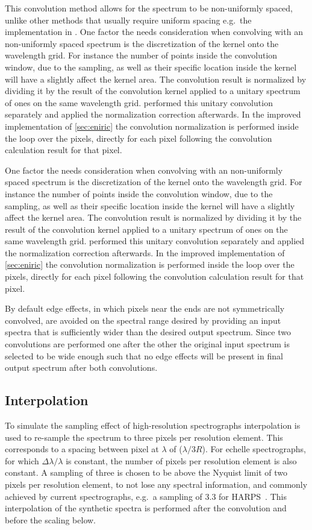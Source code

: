 This convolution method allows for the spectrum to be non-uniformly spaced, unlike other methods that usually require uniform spacing e.g.\ the implementation in \pyastronomy{}.
One factor the needs consideration when convolving with an non-uniformly spaced spectrum is the discretization of the kernel onto the wavelength grid.
For instance the number of points inside the convolution window, due to the sampling, as well as their specific location inside the kernel will have a slightly affect the kernel area.
The convolution result is normalized by dividing it by the result of the convolution kernel applied to a unitary spectrum of ones on the same wavelength grid.
\citet{figueira_radial_2016} performed this unitary convolution separately and applied the normalization correction afterwards.
In the improved implementation of \cref{sec:eniric} the convolution normalization is performed inside the loop over the pixels, directly for each pixel following the convolution calculation result for that pixel.

One factor the needs consideration when convolving with an non-uniformly spaced spectrum is the discretization of the kernel onto the wavelength grid.
For instance the number of points inside the convolution window, due to the sampling, as well as their specific location inside the kernel will have a slightly affect the kernel area.
The convolution result is normalized by dividing it by the result of the convolution kernel applied to a unitary spectrum of ones on the same wavelength grid.
\citet{figueira_radial_2016} performed this unitary convolution separately and applied the normalization correction afterwards.
In the improved implementation of \cref{sec:eniric} the convolution normalization is performed inside the loop over the pixels, directly for each pixel following the convolution calculation result for that pixel.

By default edge effects, in which pixels near the ends are not symmetrically convolved, are avoided on the spectral range desired by providing an input spectra that is sufficiently wider than the desired output spectrum.
Since two convolutions are performed one after the other the original input spectrum is selected to be wide enough such that no edge effects will be present in final output spectrum after both convolutions.

\subsection{Interpolation}
\label{subsec:orginal_interpolation}
To simulate the sampling effect of high-resolution spectrographs interpolation is used to re-sample the spectrum to three pixels per resolution element.
This corresponds to a spacing between pixel at \(\lambda\) of (\(\lambda / 3R\)).
For echelle spectrographs, for which \(\Delta\lambda/\lambda\) is constant, the number of pixels per resolution element is also constant.
A sampling of three is chosen to be above the Nyquist limit of two pixels per resolution element, to not lose any spectral information, and commonly achieved by current spectrographs, e.g.\ a sampling of 3.3 for HARPS~\citep{mayor_setting_2003}.
This interpolation of the synthetic spectra is performed after the convolution and before the \snr scaling below.

